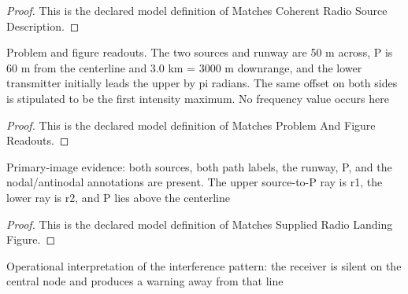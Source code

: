 \begin{proof}
  This is the declared model definition of Matches Coherent Radio Source Description.
\end{proof}
\begin{definition}
  \label{def:physics:phyx-mini-0247:phyxminiproblems-problemphyxmini0247-matchesproblemandfigurereadouts}
  Problem and figure readouts. The two sources and runway are 50 m across, P is 60 m from the centerline and 3.0 km = 3000 m downrange, and the lower transmitter initially leads the upper by pi radians. The same offset on both sides is stipulated to be the first intensity maximum. No frequency value occurs here
\end{definition}
\begin{proof}
  This is the declared model definition of Matches Problem And Figure Readouts.
\end{proof}
\begin{definition}
  \label{def:physics:phyx-mini-0247:phyxminiproblems-problemphyxmini0247-matchessuppliedradiolandingfigure}
  Primary-image evidence: both sources, both path labels, the runway, P, and the nodal/antinodal annotations are present. The upper source-to-P ray is r1, the lower ray is r2, and P lies above the centerline
\end{definition}
\begin{proof}
  This is the declared model definition of Matches Supplied Radio Landing Figure.
\end{proof}
\begin{definition}
  \label{def:physics:phyx-mini-0247:phyxminiproblems-problemphyxmini0247-matcheslandingguidancedescription}
  Operational interpretation of the interference pattern: the receiver is silent on the central node and produces a warning away from that line
\end{definition}
